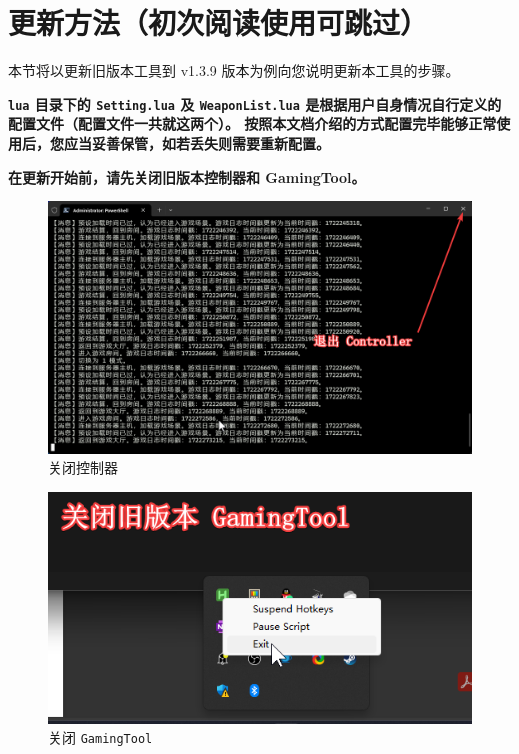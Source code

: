 \section{更新方法（初次阅读使用可跳过）}

本节将以更新旧版本工具到 v1.3.9 版本为例向您说明更新本工具的步骤。

\textbf{\color{red}\lstinline{lua} 目录下的 \lstinline{Setting.lua} 及 \lstinline{WeaponList.lua} 是根据用户自身情况自行定义的配置文件（配置文件一共就这两个）。
按照本文档介绍的方式配置完毕能够正常使用后，您应当妥善保管，如若丢失则需要重新配置。}

\textbf{\color{red}在更新开始前，请先关闭旧版本控制器和 GamingTool。}

\begin{figure}[H]
    \Centering
    \includegraphics[width=\textwidth]{docs/assets/update/close_controller.png}
    \caption{关闭控制器}
\end{figure}


\begin{figure}[H]
    \Centering
    \includegraphics[width=\textwidth]{docs/assets/update/close_gamingtool.png}
    \caption{关闭 \lstinline{GamingTool}}
\end{figure}

